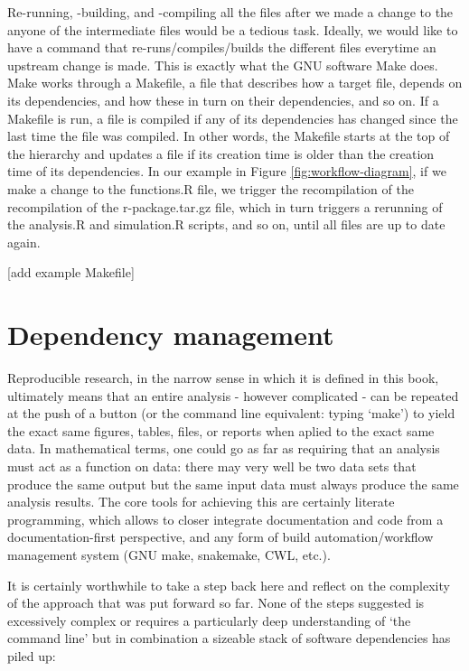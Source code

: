 \documentclass[]{book}
\begin{document}
Re-running, -building, and -compiling all the files after we made a
change to the anyone of the intermediate files would be a tedious task.
Ideally, we would like to have a command that re-runs/compiles/builds
the different files everytime an upstream change is made. This is
exactly what the GNU software Make does. Make works through a Makefile,
a file that describes how a target file, depends on its dependencies,
and how these in turn on their dependencies, and so on. If a Makefile is
run, a file is compiled if any of its dependencies has changed since the
last time the file was compiled. In other words, the Makefile starts at
the top of the hierarchy and updates a file if its creation time is
older than the creation time of its dependencies. In our example in
Figure \ref{fig:workflow-diagram}, if we make a change to the
functions.R file, we trigger the recompilation of the recompilation of
the r-package.tar.gz file, which in turn triggers a rerunning of the
analysis.R and simulation.R scripts, and so on, until all files are up
to date again.

{[}add example Makefile{]}

\chapter{Dependency management}\label{dependency-management}

Reproducible research, in the narrow sense in which it is defined in
this book, ultimately means that an entire analysis - however
complicated - can be repeated at the push of a button (or the command
line equivalent: typing `make') to yield the exact same figures, tables,
files, or reports when aplied to the exact same data. In mathematical
terms, one could go as far as requiring that an analysis must act as a
function on data: there may very well be two data sets that produce the
same output but the same input data must always produce the same
analysis results. The core tools for achieving this are certainly
literate programming, which allows to closer integrate documentation and
code from a documentation-first perspective, and any form of build
automation/workflow management system (GNU make, snakemake, CWL, etc.).

It is certainly worthwhile to take a step back here and reflect on the
complexity of the approach that was put forward so far. None of the
steps suggested is excessively complex or requires a particularly deep
understanding of `the command line' but in combination a sizeable stack
of software dependencies has piled up:
\end{document}
